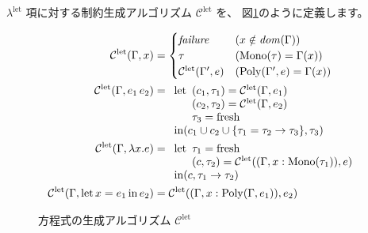 $\lambda^\mathrm{let}$ 項に対する制約生成アルゴリズム $\mathcal C^\mathrm{let}$ を、
図\ref{fig:algorithm-cp}のように定義します。

\begin{figure}[htbp]
  \begin{align*}
    \mathcal C^\mathrm{let}(\Gamma, x) &=
      \begin{cases}
        \mathit{failure}                    & (x \notin \mathit{dom}(\Gamma)) \\
        \tau                                & (\mathrm{Mono}(\tau) = \Gamma(x)) \\
        \mathcal C^\mathrm{let}(\Gamma', e) & (\mathrm{Poly}(\Gamma', e) = \Gamma(x)) \\
      \end{cases} \\
    \mathcal C^\mathrm{let}(\Gamma, e_1 \, e_2) &=
      \begin{array}[t]{l}
        \mathrm{let}
          \begin{array}[t]{l}
            (c_1, \tau_1) = \mathcal C^\mathrm{let}(\Gamma, e_1) \\
            (c_2, \tau_2) = \mathcal C^\mathrm{let}(\Gamma, e_2) \\
            \tau_3 = \mathrm{fresh}
          \end{array} \\
        \mathrm{in} (c_1 \cup c_2 \cup \{\tau_1 = \tau_2 \to \tau_3\}, \tau_3)
      \end{array} \\
    \mathcal C^\mathrm{let}(\Gamma, \lambda x . e) &=
      \begin{array}[t]{l}
        \mathrm{let}
          \begin{array}[t]{l}
            \tau_1 = \mathrm{fresh} \\
            (c, \tau_2) = \mathcal C^\mathrm{let}((\Gamma, x : \mathrm{Mono}(\tau_1)), e)
          \end{array} \\
        \mathrm{in} (c, \tau_1 \to \tau_2)
      \end{array} \\
    \mathcal C^\mathrm{let}(\Gamma, \mathrm{let} \, x = e_1 \, \mathrm{in} \, e_2) &=
      \mathcal C^\mathrm{let}((\Gamma, x : \mathrm{Poly}(\Gamma, e_1)), e_2)
  \end{align*}
  \caption{方程式の生成アルゴリズム $\mathcal C^\mathrm{let}$}
  \label{fig:algorithm-cp}
\end{figure}

